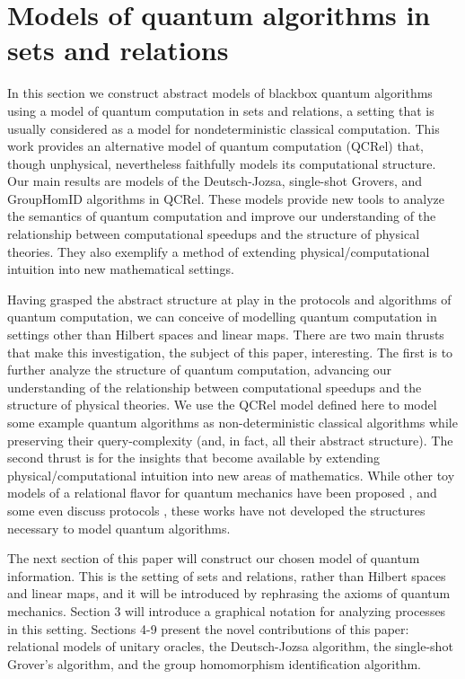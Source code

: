 \section{\color{blue} Models of quantum algorithms in sets and relations}

In this section we construct abstract models of blackbox quantum algorithms using a model of quantum computation in sets and relations, a setting that is usually considered as a model for nondeterministic classical computation.  This work provides an alternative model of quantum computation (QCRel) that, though unphysical, nevertheless faithfully models its computational structure.  Our main results are models of the Deutsch-Jozsa, single-shot Grovers, and GroupHomID algorithms in QCRel. These models provide new tools to analyze the semantics of quantum computation and improve our understanding of the relationship between computational speedups and the structure of physical theories. They also exemplify a method of extending physical/computational intuition into new mathematical settings.


Having grasped the abstract structure at play in the protocols and algorithms of quantum computation, we can conceive of modelling quantum computation in settings other than Hilbert spaces and linear maps.  There are two main thrusts that make this investigation, the subject of this paper, interesting.  The first is to further analyze the structure of quantum computation, advancing our understanding of the relationship between computational speedups and the structure of physical theories. We use the QCRel model defined here to model some example quantum algorithms as non-deterministic classical algorithms while preserving their query-complexity (and, in fact, all their abstract structure). The second thrust is for the insights that become available by extending physical/computational intuition into new areas of mathematics. While other toy models of a relational flavor for quantum mechanics have been proposed \cite{ellermanModelQM}\cite{discreteQT}\cite{modalQT}\cite{spekk}, and some even discuss protocols \cite{QCFF_James}, these works have not developed the structures necessary to model quantum algorithms.

The next section of this paper will construct our chosen model of quantum information.  This is the setting of sets and relations, rather than Hilbert spaces and linear maps, and it will be introduced by rephrasing the axioms of quantum mechanics. Section 3 will introduce a graphical notation for analyzing processes in this setting. Sections 4-9 present the novel contributions of this paper: relational models of unitary oracles, the Deutsch-Jozsa algorithm, the single-shot Grover's algorithm, and the group homomorphism identification algorithm.

